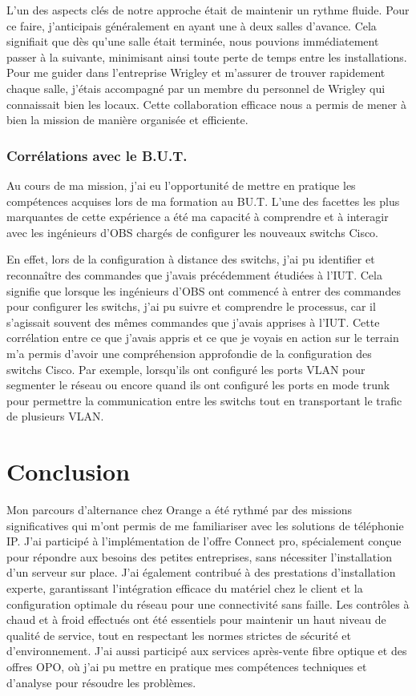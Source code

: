 \documentclass[12pt, a4paper]{article}
\begin{document}
L'un des aspects clés de notre approche était de maintenir un
rythme fluide. Pour ce faire, j'anticipais généralement en ayant
une à deux salles d'avance. Cela signifiait
que dès qu'une salle était terminée, nous pouvions immédiatement
passer à la suivante, minimisant ainsi toute perte de temps entre
les installations. Pour me guider dans l'entreprise Wrigley et
m'assurer de trouver rapidement chaque salle, j'étais accompagné
par un membre du personnel de Wrigley qui connaissait bien les locaux.
Cette collaboration efficace nous a permis de mener à bien la mission
de manière organisée et efficiente.

\subsubsection{Corrélations avec le B.U.T.}
Au cours de ma mission, j'ai eu l'opportunité de mettre en
pratique les compétences acquises lors de ma formation au BU.T.
L'une des facettes les plus marquantes de cette expérience a
été ma capacité à comprendre et à interagir avec les ingénieurs
d'OBS chargés de configurer les nouveaux switchs Cisco.

En effet, lors de la configuration à distance des switchs,
j'ai pu identifier et reconnaître des commandes que j'avais
précédemment étudiées à l'IUT. Cela signifie que lorsque les
ingénieurs d'OBS ont commencé à entrer des commandes pour
configurer les switchs, j'ai pu suivre et comprendre le processus,
car il s'agissait souvent des mêmes commandes que j'avais apprises à
l'IUT. Cette corrélation entre ce que j'avais appris et ce que
je voyais en action sur le terrain m'a permis d'avoir une
compréhension approfondie de la configuration des switchs Cisco.
Par exemple, lorsqu'ils ont configuré les ports VLAN
pour segmenter le réseau ou encore quand ils ont 
configuré les ports en mode trunk pour permettre
la communication entre les switchs tout en 
transportant le trafic de plusieurs VLAN.\\

\newpage
\section{Conclusion}
Mon parcours d'alternance chez Orange a été rythmé par des missions
significatives qui m'ont permis de me familiariser avec les solutions
de téléphonie IP. J'ai participé à
l'implémentation de l'offre Connect pro, spécialement conçue pour
répondre aux besoins des petites entreprises, sans nécessiter
l'installation d'un serveur sur place. J'ai également
contribué à des prestations d'installation experte, garantissant
l'intégration efficace du matériel chez le client et la configuration
optimale du réseau pour une connectivité sans faille. Les contrôles
à chaud et à froid effectués ont été essentiels pour maintenir un
haut niveau de qualité de service, tout en respectant les normes
strictes de sécurité et d'environnement. J'ai aussi participé
aux services après-vente fibre optique et des offres
OPO, où j'ai pu mettre en pratique mes
compétences techniques et d'analyse pour résoudre les problèmes.\\
\end{document}
